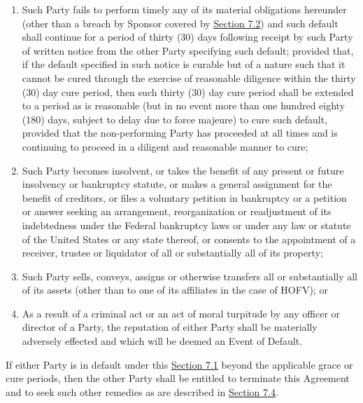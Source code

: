 \documentclass{article}
\begin{document}
\begin{enumerate}
\begin{enumerate}
    \begin{enumerate}
    \def\labelenumiii{\alph{enumiii}.}
    \item
      Such Party fails to perform timely any of its material obligations
      hereunder (other than a breach by Sponsor covered by
      \uline{Section 7.2}) and such default shall continue for a period
      of thirty (30) days following receipt by such Party of written
      notice from the other Party specifying such default; provided
      that, if the default specified in such notice is curable but of a
      nature such that it cannot be cured through the exercise of
      reasonable diligence within the thirty (30) day cure period, then
      such thirty (30) day cure period shall be extended to a period as
      is reasonable (but in no event more than one hundred eighty (180)
      days, subject to delay due to force majeure) to cure such default,
      provided that the non-performing Party has proceeded at all times
      and is continuing to proceed in a diligent and reasonable manner
      to cure;
    \item
      Such Party becomes insolvent, or takes the benefit of any present
      or future insolvency or bankruptcy statute, or makes a general
      assignment for the benefit of creditors, or files a voluntary
      petition in bankruptcy or a petition or answer seeking an
      arrangement, reorganization or readjustment of its indebtedness
      under the Federal bankruptcy laws or under any law or statute of
      the United States or any state thereof, or consents to the
      appointment of a receiver, trustee or liquidator of all or
      substantially all of its property;
    \item
      Such Party sells, conveys, assigns or otherwise transfers all or
      substantially all of its assets (other than to one of its
      affiliates in the case of HOFV); or
    \item
      As a result of a criminal act or an act of moral turpitude by any
      officer or director of a Party, the reputation of either Party
      shall be materially adversely effected and which will be deemed an
      Event of Default.
    \end{enumerate}
  \end{enumerate}
\end{enumerate}

If either Party is in default under this \uline{Section 7.1} beyond the
applicable grace or cure periods, then the other Party shall be entitled
to terminate this Agreement and to seek such other remedies as are
described in \uline{Section 7.4}.
\end{document}
